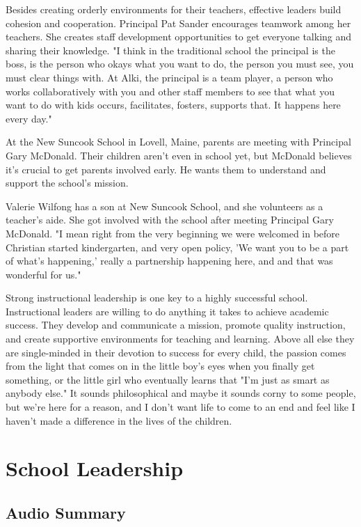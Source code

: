 Besides creating orderly environments for their teachers, effective leaders build cohesion and cooperation.
Principal Pat Sander encourages teamwork among her teachers.
She creates staff development opportunities to get everyone talking and sharing their knowledge.
"I think in the traditional school the principal is the boss, is the person who okays what you want to do, the person you must see, you must clear things with.
At Alki, the principal is a team player, a person who works collaboratively with you and other staff members to see that what you want to do with kids occurs, facilitates, fosters, supports that.
It happens here every day."

At the New Suncook School in Lovell, Maine, parents are meeting with Principal Gary McDonald.
Their children aren't even in school yet, but McDonald believes it's crucial to get parents involved early.
He wants them to understand and support the school's mission.

Valerie Wilfong has a son at New Suncook School, and she volunteers as a teacher's aide.
She got involved with the school after meeting Principal Gary McDonald.
"I mean right from the very beginning we were welcomed in before Christian started kindergarten, and very open policy, 'We want you to be a part of what's happening,' really a partnership happening here, and and that was wonderful for us."

Strong instructional leadership is one key to a highly successful school.
Instructional leaders are willing to do anything it takes to achieve academic success.
They develop and communicate a mission, promote quality instruction, and create supportive environments for teaching and learning.
Above all else they are single-minded in their devotion to success for every child, the passion comes from the light that comes on in the little boy's eyes when you finally get something, or the little girl who eventually learns that "I'm just as smart as anybody else." It sounds philosophical and maybe it sounds corny to some people, but we're here for a reason, and I don't want life to come to an end and feel like I haven't made a difference in the lives of the children.

\section{School Leadership}

\subsection{Audio Summary}

